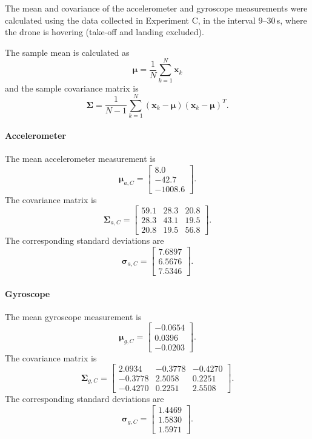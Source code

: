 \documentclass[10pt,a4paper]{article}
\newenvironment{answer}{%
  \begin{tcolorbox}[breakable,enhanced,colback=white,colframe=greyline,
    boxrule=0.6pt,arc=2pt,left=8pt,right=8pt,top=7pt,bottom=7pt,
    before skip=0pt,after skip=12pt]
}{\end{tcolorbox}}
\begin{document}
\begin{answer}
The mean and covariance of the accelerometer and gyroscope measurements were calculated using the data collected in Experiment C, in the interval $9$--$30$\,s, where the drone is hovering (take-off and landing excluded).

The sample mean is calculated as
\[
\boldsymbol{\mu}=\frac{1}{N}\sum_{k=1}^{N}\mathbf{x}_k
\]
and the sample covariance matrix is
\[
\boldsymbol{\Sigma}=
\frac{1}{N-1}\sum_{k=1}^{N}
(\mathbf{x}_k-\boldsymbol{\mu})
(\mathbf{x}_k-\boldsymbol{\mu})^T.
\]

\paragraph{Accelerometer}
The mean accelerometer measurement is
\[
\boldsymbol{\mu}_{a,C}=
\begin{bmatrix}
8.0\\
-42.7\\
-1008.6
\end{bmatrix}.
\]
The covariance matrix is
\[
\boldsymbol{\Sigma}_{a,C}=
\begin{bmatrix}
59.1 & 28.3 & 20.8\\
28.3 & 43.1 & 19.5\\
20.8 & 19.5 & 56.8
\end{bmatrix}.
\]
The corresponding standard deviations are
\[
\boldsymbol{\sigma}_{a,C}=
\begin{bmatrix}
7.6897\\
6.5676\\
7.5346
\end{bmatrix}.
\]

\paragraph{Gyroscope}
The mean gyroscope measurement is
\[
\boldsymbol{\mu}_{g,C}=
\begin{bmatrix}
-0.0654\\
0.0396\\
-0.0203
\end{bmatrix}.
\]
The covariance matrix is
\[
\boldsymbol{\Sigma}_{g,C}=
\begin{bmatrix}
2.0934 & -0.3778 & -0.4270\\
-0.3778 & 2.5058 & 0.2251\\
-0.4270 & 0.2251 & 2.5508
\end{bmatrix}.
\]
The corresponding standard deviations are
\[
\boldsymbol{\sigma}_{g,C}=
\begin{bmatrix}
1.4469\\
1.5830\\
1.5971
\end{bmatrix}.
\]


\end{answer}
\end{document}
